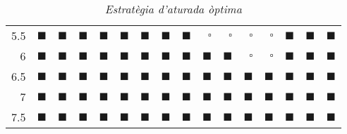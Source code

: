 \documentclass[9pt]{IEEEtran}
\begin{document}
\begin{table*}[htb]
\begin{center}
\begin{tabular}{rrrrrrrrrrrrrrrr}
  5.5 &  $\blacksquare$ & $\blacksquare$ & $\blacksquare$ & $\blacksquare$ & $\blacksquare$ & $\blacksquare$ & $\blacksquare$ & $\blacksquare$ & $\square$ & $\square$ & $\square$ & $\square$ & $\blacksquare$ & $\blacksquare$ & $\blacksquare$  \\ 
  6 & $\blacksquare$ & $\blacksquare$ & $\blacksquare$ & $\blacksquare$ &$\blacksquare$ & $\blacksquare$ & $\blacksquare$ & $\blacksquare$ & $\blacksquare$ & $\blacksquare$ & $\square$ & $\square$ & $\blacksquare$ & $\blacksquare$ & $\blacksquare$ \\ 
  6.5& $\blacksquare$ & $\blacksquare$ & $\blacksquare$ & $\blacksquare$ & $\blacksquare$ & $\blacksquare$& $\blacksquare$& $\blacksquare$&$\blacksquare$ & $\blacksquare$ & $\blacksquare$ & $\blacksquare$ & $\blacksquare$& $\blacksquare$ & $\blacksquare$\\ 
  7 & $\blacksquare$ & $\blacksquare$ & $\blacksquare$ & $\blacksquare$ & $\blacksquare$ & $\blacksquare$& $\blacksquare$& $\blacksquare$&$\blacksquare$ & $\blacksquare$ & $\blacksquare$ & $\blacksquare$ & $\blacksquare$& $\blacksquare$ & $\blacksquare$\\ 
  7.5 & $\blacksquare$ & $\blacksquare$ & $\blacksquare$ & $\blacksquare$ & $\blacksquare$ & $\blacksquare$& $\blacksquare$& $\blacksquare$&$\blacksquare$ & $\blacksquare$ & $\blacksquare$ & $\blacksquare$ & $\blacksquare$& $\blacksquare$ & $\blacksquare$\\ 
   \hline
\end{tabular}
\end{center}
\caption{\textit{Estratègia d'aturada òptima}}
\label{EstrategiaOptimaDoblant}


\end{table*}
\end{document}
